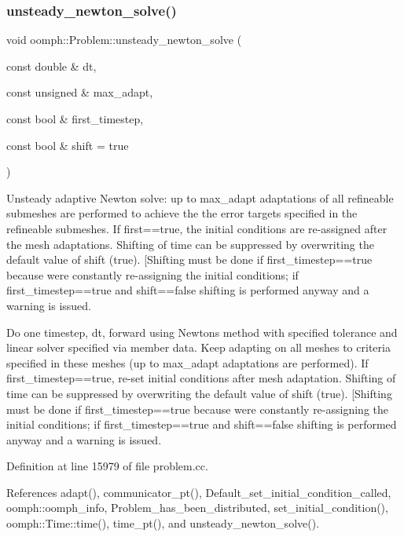 \subsubsection{\texorpdfstring{unsteady\+\_\+newton\+\_\+solve()}{unsteady\_newton\_solve()}\hspace{0.1cm}{\footnotesize\ttfamily [3/3]}}
{\footnotesize\ttfamily void oomph\+::\+Problem\+::unsteady\+\_\+newton\+\_\+solve (\begin{DoxyParamCaption}\item[{const double \&}]{dt,  }\item[{const unsigned \&}]{max\+\_\+adapt,  }\item[{const bool \&}]{first\+\_\+timestep,  }\item[{const bool \&}]{shift = {\ttfamily true} }\end{DoxyParamCaption})}



Unsteady adaptive Newton solve\+: up to max\+\_\+adapt adaptations of all refineable submeshes are performed to achieve the the error targets specified in the refineable submeshes. If first==true, the initial conditions are re-\/assigned after the mesh adaptations. Shifting of time can be suppressed by overwriting the default value of shift (true). \mbox{[}Shifting must be done if first\+\_\+timestep==true because we\textquotesingle{}re constantly re-\/assigning the initial conditions; if first\+\_\+timestep==true and shift==false shifting is performed anyway and a warning is issued. 

Do one timestep, dt, forward using Newton\textquotesingle{}s method with specified tolerance and linear solver specified via member data. Keep adapting on all meshes to criteria specified in these meshes (up to max\+\_\+adapt adaptations are performed). If first\+\_\+timestep==true, re-\/set initial conditions after mesh adaptation. Shifting of time can be suppressed by overwriting the default value of shift (true). \mbox{[}Shifting must be done if first\+\_\+timestep==true because we\textquotesingle{}re constantly re-\/assigning the initial conditions; if first\+\_\+timestep==true and shift==false shifting is performed anyway and a warning is issued. 

Definition at line 15979 of file problem.\+cc.



References adapt(), communicator\+\_\+pt(), Default\+\_\+set\+\_\+initial\+\_\+condition\+\_\+called, oomph\+::oomph\+\_\+info, Problem\+\_\+has\+\_\+been\+\_\+distributed, set\+\_\+initial\+\_\+condition(), oomph\+::\+Time\+::time(), time\+\_\+pt(), and unsteady\+\_\+newton\+\_\+solve().

